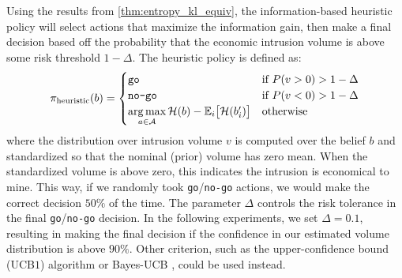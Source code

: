 Using the results from \cref{thm:entropy_kl_equiv}, the information-based heuristic policy will select actions that maximize the information gain, then make a final decision based off the probability that the economic intrusion volume is above some risk threshold $1 - \Delta$.
The heuristic policy is defined as:
\begin{equation}
    \pi_\text{heuristic}(b) = \begin{cases}
        \texttt{go} & \text{if } P(v > 0) > 1 - \Delta \\
        \texttt{no-go} & \text{if } P(v < 0) > 1 - \Delta \\
        \argmax\limits_{a \in \mathcal{A}} \mathcal{H}(b) - \mathbb{E}_i\big[\mathcal{H}(b'_i)\big] & \text{otherwise}
    \end{cases} \label{eq:muon_heuristic}
\end{equation}
where the distribution over intrusion volume $v$ is computed over the belief $b$ and standardized so that the nominal (prior) volume has zero mean.
When the standardized volume is above zero, this indicates the intrusion is economical to mine.
This way, if we randomly took \texttt{go}/\texttt{no-go} actions, we would make the correct decision $50\%$ of the time.
The parameter $\Delta$ controls the risk tolerance in the final \texttt{go}/\texttt{no-go} decision.
In the following experiments, we set $\Delta = 0.1$, resulting in making the final decision if the confidence in our estimated volume distribution is above $90\%$.
Other criterion, such as the upper-confidence bound (UCB$1$) algorithm \cite{auer2002finite} or Bayes-UCB \cite{kaufmann2012bayesian}, could be used instead.


